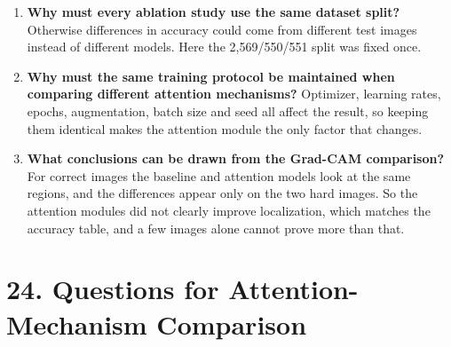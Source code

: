 \documentclass[11pt]{article}
\begin{document}
\begin{enumerate}
\item \textbf{Why must every ablation study use the same dataset split?}
Otherwise differences in accuracy could come from different test images
instead of different models. Here the 2{,}569/550/551 split was fixed once.

\item \textbf{Why must the same training protocol be maintained when comparing different attention mechanisms?}
Optimizer, learning rates, epochs, augmentation, batch size and seed all
affect the result, so keeping them identical makes the attention module the
only factor that changes.

\item \textbf{What conclusions can be drawn from the Grad-CAM comparison?}
For correct images the baseline and attention models look at the same
regions, and the differences appear only on the two hard images. So the
attention modules did not clearly improve localization, which matches the
accuracy table, and a few images alone cannot prove more than that.
\end{enumerate}

\section*{24. Questions for Attention-Mechanism Comparison}
\end{document}
